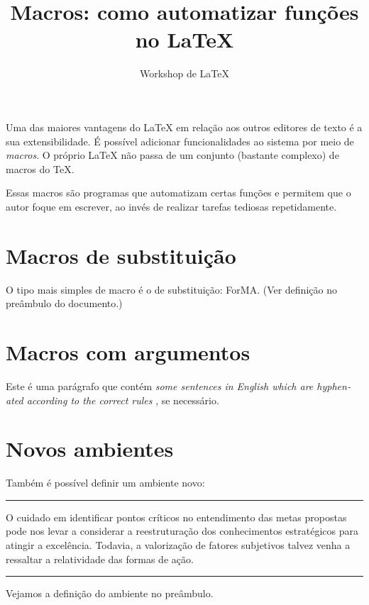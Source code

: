 \documentclass[a4paper]{article}
\title{Macros: como automatizar funções no \LaTeX}
\author{Workshop de LaTeX}
\newcommand{\forma}{ForMA\xspace}
\newcommand{\eng}[1]{%
  \emph{\textenglish{#1}}%
}
\newenvironment{spotlight}
{
  \vspace{1em}
  \noindent\rule{\linewidth}{.5pt}\par\vspace{5pt}
  \noindent\ignorespaces
}
{
  \par
  \noindent\rule{\linewidth}{.5pt}
  \vspace{1em}\ignorespacesafterend
}
\begin{document}
\frenchspacing

\maketitle

Uma das maiores vantagens do \LaTeX{} em relação aos outros editores de texto é
a sua extensibilidade. É possível adicionar funcionalidades ao sistema por meio
de \emph{macros}. O próprio \LaTeX{} não passa de um conjunto (bastante
complexo) de macros do \TeX.

Essas macros são programas que automatizam certas funções e permitem que o
autor foque em escrever, ao invés de realizar tarefas tediosas repetidamente.

\section{Macros de substituição}

O tipo mais simples de macro é o de substituição: \forma. (Ver definição
no preâmbulo do documento.)

\section{Macros com argumentos}

Este é uma parágrafo que contém \eng{some sentences in English which are
hyphenated according to the correct rules}, se necessário.

\section{Novos ambientes}

Também é possível definir um ambiente novo:

\begin{spotlight}
  O cuidado em identificar pontos críticos no entendimento das metas propostas
  pode nos levar a considerar a reestruturação dos conhecimentos estratégicos
  para atingir a excelência. Todavia, a valorização de fatores subjetivos
  talvez venha a ressaltar a relatividade das formas de ação.
\end{spotlight}

Vejamos a definição do ambiente no preâmbulo.
\end{document}
